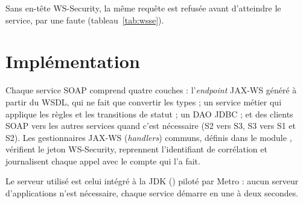 Sans en-tête WS-Security, la même requête est refusée avant d'atteindre le service, par une faute  (tableau~\ref{tab:wsse}).

\section{Implémentation}

Chaque service SOAP comprend quatre couches : l'\emph{endpoint} JAX-WS généré à partir du WSDL, qui ne fait que convertir les types ; un service métier qui applique les règles et les transitions de statut ; un DAO JDBC ; et des clients SOAP vers les autres services quand c'est nécessaire (S2 vers S3, S3 vers S1 et S2). Les gestionnaires JAX-WS (\emph{handlers}) communs, définis dans le module , vérifient le jeton WS-Security, reprennent l'identifiant de corrélation et journalisent chaque appel avec le compte qui l'a fait.

Le serveur utilisé est celui intégré à la JDK () piloté par Metro : aucun serveur d'applications n'est nécessaire, chaque service démarre en une à deux secondes.
